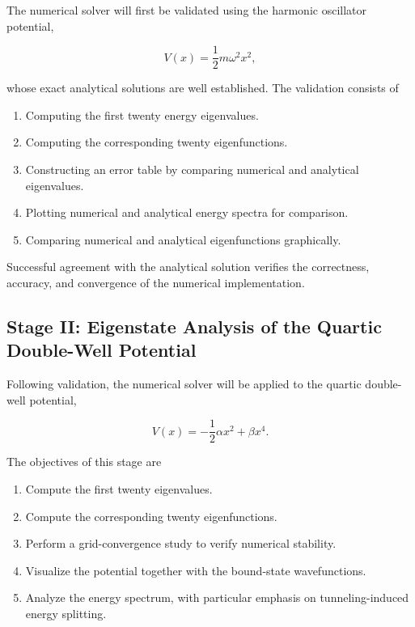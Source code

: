\documentclass[11pt,a4paper]{article}
\begin{document}
The numerical solver will first be validated using the harmonic oscillator potential,

\begin{equation}
V(x)=\frac{1}{2}m\omega^2x^2,
\end{equation}

whose exact analytical solutions are well established. The validation consists of

\begin{enumerate}
    \item Computing the first twenty energy eigenvalues.
    \item Computing the corresponding twenty eigenfunctions.
    \item Constructing an error table by comparing numerical and analytical eigenvalues.
    \item Plotting numerical and analytical energy spectra for comparison.
    \item Comparing numerical and analytical eigenfunctions graphically.
\end{enumerate}

Successful agreement with the analytical solution verifies the correctness, accuracy, and convergence of the numerical implementation.

\subsection{Stage II: Eigenstate Analysis of the Quartic Double-Well Potential}

Following validation, the numerical solver will be applied to the quartic double-well potential,

\begin{equation}
V(x)=-\frac{1}{2}\alpha x^2+\beta x^4.
\end{equation}

The objectives of this stage are

\begin{enumerate}
    \item Compute the first twenty eigenvalues.
    \item Compute the corresponding twenty eigenfunctions.
    \item Perform a grid-convergence study to verify numerical stability.
    \item Visualize the potential together with the bound-state wavefunctions.
    \item Analyze the energy spectrum, with particular emphasis on tunneling-induced energy splitting.
\end{enumerate}
\end{document}
